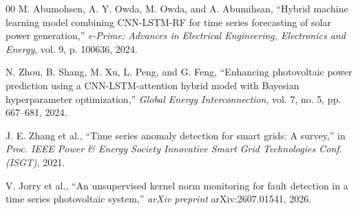 \documentclass[conference]{IEEEtran}
\begin{document}
\begin{thebibliography}{00}
 M. Abumohsen, A. Y. Owda, M. Owda, and A. Abumihsan, ``Hybrid machine learning model combining CNN-LSTM-RF for time series forecasting of solar power generation,'' \textit{e-Prime: Advances in Electrical Engineering, Electronics and Energy}, vol. 9, p. 100636, 2024.

 N. Zhou, B. Shang, M. Xu, L. Peng, and G. Feng, ``Enhancing photovoltaic power prediction using a CNN-LSTM-attention hybrid model with Bayesian hyperparameter optimization,'' \textit{Global Energy Interconnection}, vol. 7, no. 5, pp. 667--681, 2024.

 J. E. Zhang et al., ``Time series anomaly detection for smart grids: A survey,'' in \textit{Proc. IEEE Power \& Energy Society Innovative Smart Grid Technologies Conf. (ISGT)}, 2021.

 V. Jorry et al., ``An unsupervised kernel norm monitoring for fault detection in a time series photovoltaic system,'' \textit{arXiv preprint} arXiv:2607.01541, 2026.

\end{thebibliography}
\end{document}
